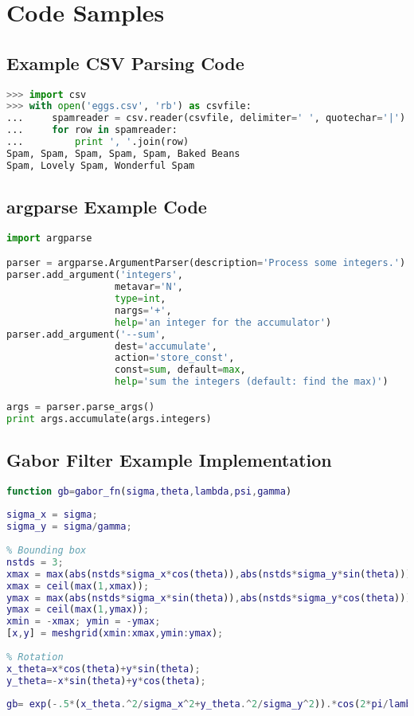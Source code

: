 \chapter{Code Samples}

\section{Example CSV Parsing Code}
\begin{lstlisting}[language=python,breaklines=true,
caption={Example CSV Parsing Code from http://docs.python.org/2/library/csv.html},label=lst:csv_example_code]
>>> import csv
>>> with open('eggs.csv', 'rb') as csvfile:
...     spamreader = csv.reader(csvfile, delimiter=' ', quotechar='|')
...     for row in spamreader:
...         print ', '.join(row)
Spam, Spam, Spam, Spam, Spam, Baked Beans
Spam, Lovely Spam, Wonderful Spam
\end{lstlisting}

\section{argparse Example Code}
\begin{lstlisting}[language=python,
caption={Example argparse Code from http://docs.python.org/2/library/argparse.html},
label=lst:argparse_example_code]
import argparse

parser = argparse.ArgumentParser(description='Process some integers.')
parser.add_argument('integers',
                   metavar='N',
                   type=int, 
                   nargs='+',
                   help='an integer for the accumulator')
parser.add_argument('--sum',
                   dest='accumulate',
                   action='store_const',
                   const=sum, default=max,
                   help='sum the integers (default: find the max)')

args = parser.parse_args()
print args.accumulate(args.integers)
\end{lstlisting}

\section{Gabor Filter Example Implementation}
\begin{lstlisting}[language=MATLAB,breaklines=true,
caption={Example implementation of a Gabor Filter in MATLAB from wikipedia\cite{Contributors2012Gabor}}]
function gb=gabor_fn(sigma,theta,lambda,psi,gamma)
 
sigma_x = sigma;
sigma_y = sigma/gamma;
 
% Bounding box
nstds = 3;
xmax = max(abs(nstds*sigma_x*cos(theta)),abs(nstds*sigma_y*sin(theta)));
xmax = ceil(max(1,xmax));
ymax = max(abs(nstds*sigma_x*sin(theta)),abs(nstds*sigma_y*cos(theta)));
ymax = ceil(max(1,ymax));
xmin = -xmax; ymin = -ymax;
[x,y] = meshgrid(xmin:xmax,ymin:ymax);
 
% Rotation 
x_theta=x*cos(theta)+y*sin(theta);
y_theta=-x*sin(theta)+y*cos(theta);
 
gb= exp(-.5*(x_theta.^2/sigma_x^2+y_theta.^2/sigma_y^2)).*cos(2*pi/lambda*x_theta+psi);
\end{lstlisting}


